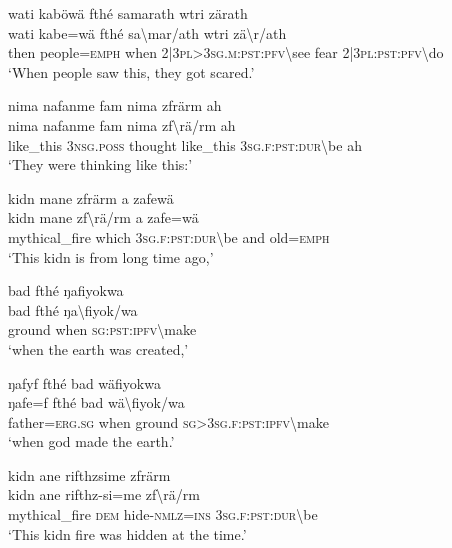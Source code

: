 \ea\label{ex:11:a2530}
wati kaböwä fthé samarath wtri zärath\\
\gll wati	kabe=wä	fthé	sa{\textbackslash}mar/ath	wtri	zä{\textbackslash}r/ath\\
     then	people=\textsc{emph}	when	2|3\textsc{pl}>3\textsc{sg}.\textsc{m}:\textsc{pst}:\textsc{pfv}{\textbackslash}see	fear	2|3\textsc{pl}:\textsc{pst}:\textsc{pfv}{\textbackslash}do\\
\glt `When people saw this, they got scared.'
\z

\ea\label{ex:11:a2531}
nima nafanme fam nima zfrärm ah\\
\gll nima	nafanme	fam	nima	zf{\textbackslash}rä/rm	ah\\
     like\_this	3\textsc{nsg}.\textsc{poss}	thought	like\_this	3\textsc{sg}.\textsc{f}:\textsc{pst}:\textsc{dur}{\textbackslash}be	ah\\
\glt `They were thinking like this:'
\z

\ea\label{ex:11:a2533}
kidn mane zfrärm a zafewä\\
\gll kidn	mane	zf{\textbackslash}rä/rm	a	zafe=wä\\
     mythical\_fire	which	3\textsc{sg}.\textsc{f}:\textsc{pst}:\textsc{dur}{\textbackslash}be	and	old=\textsc{emph}\\
\glt `This kidn is from long time ago,'
\z

\ea\label{ex:11:a2535}
bad fthé ŋafiyokwa\\
\gll bad	fthé	ŋa{\textbackslash}fiyok/wa\\
     ground	when	\textsc{sg}:\textsc{pst}:\textsc{ipfv}{\textbackslash}make\\
\glt `when the earth was created,'
\z

\ea\label{ex:11:a2536}
ŋafyf fthé bad wäfiyokwa\\
\gll ŋafe=f	fthé	bad	wä{\textbackslash}fiyok/wa\\
     father=\textsc{erg}.\textsc{sg}	when	ground	\textsc{sg}>3\textsc{sg}.\textsc{f}:\textsc{pst}:\textsc{ipfv}{\textbackslash}make\\
\glt `when god made the earth.'
\z

\ea\label{ex:11:a2537}
kidn ane rifthzsime zfrärm\\
\gll kidn	ane	rifthz-si=me	zf{\textbackslash}rä/rm\\
     mythical\_fire	\textsc{dem}	hide-\textsc{nmlz}=\textsc{ins}	3\textsc{sg}.\textsc{f}:\textsc{pst}:\textsc{dur}{\textbackslash}be\\
\glt `This kidn fire was hidden at the time.'
\z

